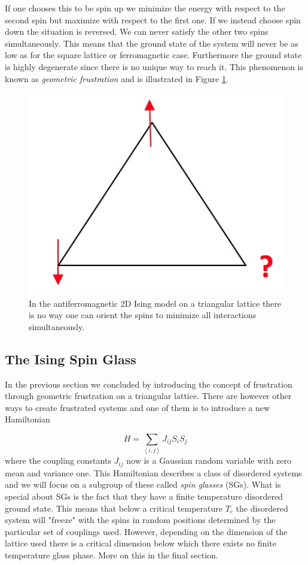 \documentclass[paper=a4, fontsize=11pt]{scrartcl} %
\numberwithin{equation}{section} %
\numberwithin{figure}{section} %
\numberwithin{table}{section} %
\begin{document}
If one chooses this to be spin up we minimize the energy with respect to the second spin but maximize with respect to the first one. If we instead choose spin down the situation is reversed. We can never satisfy the other two spins simultaneously. This means that the ground state of the system will never be as low as for the square lattice or ferromagnetic case. Furthermore the ground state is highly degenerate since there is no unique way to reach it. This phenomenon is known as \emph{geometric frustration} and is illustrated in Figure \ref{fig:frustration}.

\begin{figure}[hbtp]
\centering
\includegraphics[width=\textwidth]{frustration.jpg}
\caption{In the antiferromagnetic 2D Ising model on a triangular lattice there is no way one can orient the spins to minimize all interactions simultaneously.}
\label{fig:frustration}
\end{figure}

\subsection{The Ising Spin Glass}
In the previous section we concluded by introducing the concept of frustration through geometric frustration on a triangular lattice. There are however other ways to create frustrated systems and one of them is to introduce a new Hamiltonian

\begin{equation}
H=\sum\limits_{\left\langle i,j \right\rangle} J_{ij} S_{i} S_{j}
\end{equation}
where the coupling constants $J_{ij}$ now is a Gaussian random variable with zero mean and variance one. This Hamiltonian describes a class of disordered systems and we will focus on a subgroup of these called \emph{spin glasses} (SGs). What is special about SGs is the fact that they have a finite temperature disordered ground state. This means that below a critical temperature $T_c$ the disordered system will "freeze" with the spins in random positions determined by the particular set of couplings used. However, depending on the dimension of the lattice used there is a critical dimension below which there exists no finite temperature glass phase\cite{almeida}. More on this in the final section.
\end{document}
